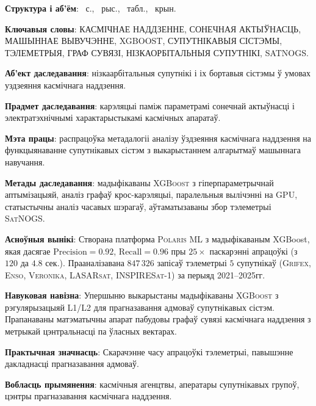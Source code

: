 \textbf{Структура і аб’ём}: \maincontentpages~с., \totalfigures~рыс.,
\totaltables~табл., \thetotalsources~крын.

\textbf{Ключавыя словы}: КАСМІЧНАЕ НАДДЗЕННЕ, СОНЕЧНАЯ АКТЫЎНАСЦЬ, МАШЫННАЕ ВЫВУЧЭННЕ, XGBOOST, СУПУТНІКАВЫЯ СІСТЭМЫ, ТЭЛЕМЕТРЫЯ, ГРАФ СУВЯЗІ, НІЗКАОРБІТАЛЬНЫЯ СУПУТНІКІ, SATNOGS.

\textbf{Аб’ект даследавання}: нізкаарбітальныя супутнікі і іх бортавыя сістэмы ў умовах уздзеяння касмічнага наддзення.

\textbf{Прадмет даследавання}: карэляцыі паміж параметрамі сонечнай актыўнасці і электратэхнічнымі характарыстыкамі касмічных апаратаў.

\textbf{Мэта працы}: распрацоўка метадалогіі аналізу ўздзеяння касмічнага наддзення на функцыянаванне супутнікавых сістэм з выкарыстаннем алгарытмаў машыннага навучання.

\textbf{Метады даследавання}: мадыфікаваны \textsc{XGBoost} з гіперпараметрычнай аптымізацыяй, аналіз графаў крос-карэляцыі, паралельныя вылічэнні на \textsc{GPU}, статыстычны аналіз часавых шэрагаў, аўтаматызаваны збор тэлеметрыі \textsc{SatNOGS}.

\textbf{Асноўныя вынікі}: Створана платформа \textsc{Polaris ML} з мадыфікаваным XGBoost, якая дасягае 
$\text{Precision} = 0.92$, $\text{Recall} = 0.96$ пры $25{\times}$ паскарэнні апрацоўкі (з $120$ да $4.8$ сек.). Прааналізавана $847{\,}326$ запісаў тэлеметрыі $5$ супутнікаў (\textsc{Grifex}, \textsc{Enso}, \textsc{Veronika}, \textsc{LASARsat}, \textsc{INSPIRESat-1}) за перыяд 2021--2025гг.

\textbf{Навуковая навізна}: Упершыню выкарыстаны мадыфікаваны \textsc{XGBoost} з рэгулярызацыяй L1/L2 для прагназавання адмоваў супутнікавых сістэм. Прапанаваны матэматычны апарат пабудовы графаў сувязі касмічнага наддзення з метрыкай цэнтральнасці па ўласных вектарах.

\textbf{Практычная значнасць}: Скарачэнне часу апрацоўкі тэлеметрыі, павышэнне дакладнасці прагназавання адмоваў.

\textbf{Вобласць прымянення}: касмічныя агенцтвы, аператары супутнікавых групоў, цэнтры прагназавання касмічнага наддзення.
